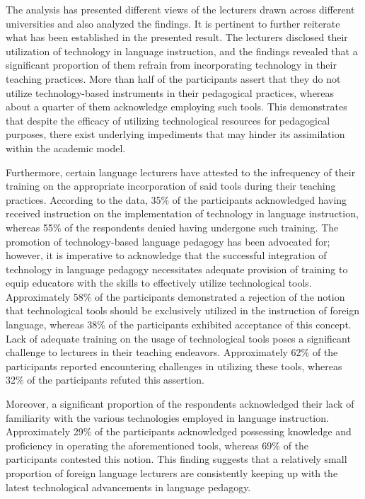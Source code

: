 \documentclass[english]{textolivre}
\begin{document}
The analysis has presented different views of the lecturers drawn across different universities and also analyzed the findings. It is pertinent to further reiterate what has been established in the presented result. The lecturers disclosed their utilization of technology in language instruction, and the findings revealed that a significant proportion of them refrain from incorporating technology in their teaching practices. More than half of the participants assert that they do not utilize technology-based instruments in their pedagogical practices, whereas about a quarter of them acknowledge employing such tools. This demonstrates that despite the efficacy of utilizing technological resources for pedagogical purposes, there exist underlying impediments that may hinder its assimilation within the academic model.

Furthermore, certain language lecturers have attested to the infrequency of their training on the appropriate incorporation of said tools during their teaching practices. According to the data, 35\% of the participants acknowledged having received instruction on the implementation of technology in language instruction, whereas 55\% of the respondents denied having undergone such training. The promotion of technology-based language pedagogy has been advocated for; however, it is imperative to acknowledge that the successful integration of technology in language pedagogy necessitates adequate provision of training to equip educators with the skills to effectively utilize technological tools. Approximately 58\% of the participants demonstrated a rejection of the notion that technological tools should be exclusively utilized in the instruction of foreign language, whereas 38\% of the participants exhibited acceptance of this concept. Lack of adequate training on the usage of technological tools poses a significant challenge to lecturers in their teaching endeavors. Approximately 62\% of the participants reported encountering challenges in utilizing these tools, whereas 32\% of the participants refuted this assertion.

Moreover, a significant proportion of the respondents acknowledged their lack of familiarity with the various technologies employed in language instruction. Approximately 29\% of the participants acknowledged possessing knowledge and proficiency in operating the aforementioned tools, whereas 69\% of the participants contested this notion. This finding suggests that a relatively small proportion of foreign language lecturers are consistently keeping up with the latest technological advancements in language pedagogy.
\end{document}
